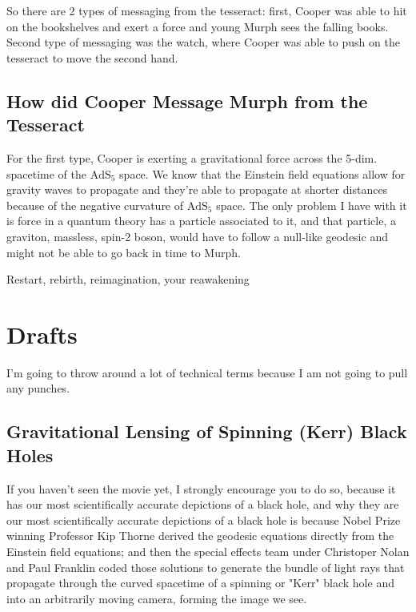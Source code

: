 \documentclass[10pt]{amsart}
\begin{document}
So there are 2 types of messaging from the tesseract: first, Cooper was able to hit on the bookshelves and exert a force and young Murph sees the falling books. Second type of messaging was the watch, where Cooper was able to push on the tesseract to move the second hand.

\subsection{How did Cooper Message Murph from the Tesseract}

For the first type, Cooper is exerting a gravitational force across the 5-dim. spacetime of the $\text{AdS}_5$ space. We know that the Einstein field equations allow for gravity waves to propagate and they're able to propagate at shorter distances because of the negative curvature of $\text{AdS}_5$ space. The only problem I have with it is force in a quantum theory has a particle associated to it, and that particle, a graviton, massless, spin-2 boson, would have to follow a null-like geodesic and might not be able to go back in time to Murph.

Restart, rebirth, reimagination, your reawakening





\section{Drafts}

I'm going to throw around a lot of technical terms because I am not going to pull any punches.

\subsection{Gravitational Lensing of Spinning (Kerr) Black Holes}

If you haven't seen the movie yet, I strongly encourage you to do so, because it has our most scientifically accurate depictions of a black hole, and why they are our most scientifically accurate depictions of a black hole is because Nobel Prize winning Professor Kip Thorne derived the geodesic equations directly from the Einstein field equations; and then the special effects team under Christoper Nolan and Paul Franklin coded those solutions to generate the bundle of light rays that propagate through the curved spacetime of a spinning or "Kerr" black hole and into an arbitrarily moving camera, forming the image we see.
\end{document}
